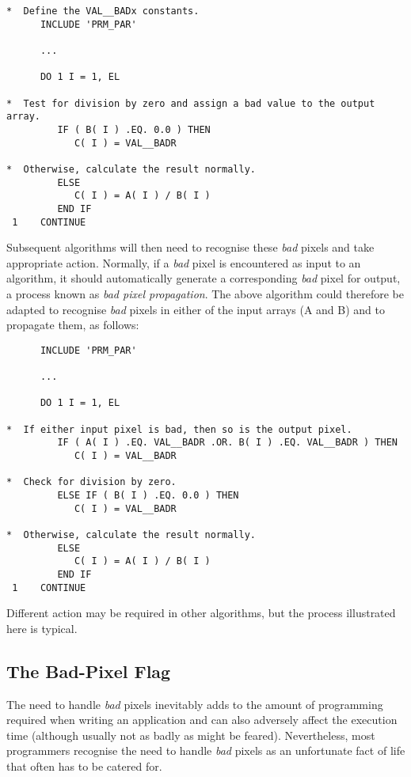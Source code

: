 \documentclass[twoside,11pt]{article}
\newcommand{\xlabel}[1]{}
\newcommand{\st}[1]{{\em{#1}}}
\begin{document}
\small
\begin{verbatim}
*  Define the VAL__BADx constants.
      INCLUDE 'PRM_PAR'

      ...

      DO 1 I = 1, EL

*  Test for division by zero and assign a bad value to the output array.
         IF ( B( I ) .EQ. 0.0 ) THEN
            C( I ) = VAL__BADR

*  Otherwise, calculate the result normally.
         ELSE
            C( I ) = A( I ) / B( I )
         END IF
 1    CONTINUE
\end{verbatim}
\normalsize

Subsequent algorithms will then need to recognise these \st{bad\/} pixels and
take appropriate action. 
Normally, if a \st{bad\/} pixel is encountered as input to an algorithm, it 
should automatically generate a corresponding \st{bad\/} pixel for output, a 
process known as \st{bad pixel propagation}.
The above algorithm could therefore be adapted to recognise \st{bad\/} pixels
in either of the input arrays (A and B) and to propagate them, as follows: 

\small
\begin{verbatim}
      INCLUDE 'PRM_PAR'

      ...

      DO 1 I = 1, EL

*  If either input pixel is bad, then so is the output pixel.
         IF ( A( I ) .EQ. VAL__BADR .OR. B( I ) .EQ. VAL__BADR ) THEN
            C( I ) = VAL__BADR

*  Check for division by zero.
         ELSE IF ( B( I ) .EQ. 0.0 ) THEN
            C( I ) = VAL__BADR

*  Otherwise, calculate the result normally.
         ELSE
            C( I ) = A( I ) / B( I )
         END IF
 1    CONTINUE
\end{verbatim}
\normalsize

Different action may be required in other algorithms, but the process
illustrated here is typical. 

\subsection{\xlabel{the_bad-pixel_flag}\label{ss:noexplicitchecks}The Bad-Pixel Flag}

The need to handle \st{bad\/} pixels inevitably adds to the amount of
programming required when writing an application and can also adversely
affect the execution time (although usually not as badly as might be
feared). 
Nevertheless, most programmers recognise the need to handle \st{bad\/} pixels
as an unfortunate fact of life that often has to be catered for. 
\end{document}
